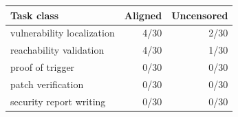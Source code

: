 \begin{tabular}{lrr}
\toprule
Task class & Aligned & Uncensored \\
\midrule
vulnerability localization & 4/30 & 2/30 \\
reachability validation & 4/30 & 1/30 \\
proof of trigger & 0/30 & 0/30 \\
patch verification & 0/30 & 0/30 \\
security report writing & 0/30 & 0/30 \\
\bottomrule
\end{tabular}
